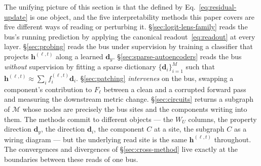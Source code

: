 The unifying picture of this section is that the 
defined by Eq.~\eqref{eq:residual-update} is one object, and the five
interpretability methods this paper covers are five different ways of
reading or perturbing it.
\S\ref{sec:logit-lens-family} reads the bus's running prediction by
applying the canonical readout~\eqref{eq:readout} at every layer.
\S\ref{sec:probing} reads the bus under supervision by training a
classifier that projects $\mathbf{h}^{(\ell, t)}$ along a learned
$\mathbf{d}_y$. \S\ref{sec:sparse-autoencoders} reads the bus
\emph{without} supervision by fitting a sparse dictionary
$\{\mathbf{d}_i\}_{i=1}^M$ such that
$\mathbf{h}^{(\ell, t)} \approx \sum_i f_i^{(\ell, t)} \mathbf{d}_i$.
\S\ref{sec:patching} \emph{intervenes} on the bus, swapping a
component's contribution to $F_\ell$ between a clean and a corrupted
forward pass and measuring the downstream metric change.
\S\ref{sec:circuits} returns a subgraph of $\mathcal{M}$ whose nodes
are precisely the bus sites and the components writing into them.
The methods commit to different objects --- the $W_U$ columns, the
property direction $\mathbf{d}_y$, the  direction $\mathbf{d}_i$,
the component $C$ at a  site, the subgraph $C$ as a wiring
diagram --- but the underlying read site is the same
$\mathbf{h}^{(\ell, t)}$ throughout. The convergences and divergences
of \S\ref{sec:cross-method} live exactly at the boundaries between
these reads of one bus.
